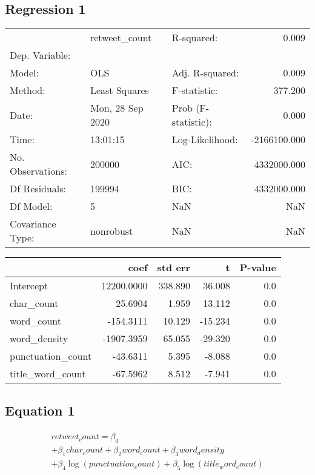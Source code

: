 
\subsection{Regression 1}
\begin{tabular}{lllr}
\toprule
{} &     retweet\_count &           R-squared: &        0.009 \\
Dep. Variable:    &                   &                      &              \\
\midrule
Model:            &               OLS &      Adj. R-squared: &        0.009 \\
Method:           &     Least Squares &         F-statistic: &      377.200 \\
Date:             &  Mon, 28 Sep 2020 &  Prob (F-statistic): &        0.000 \\
Time:             &          13:01:15 &      Log-Likelihood: & -2166100.000 \\
No. Observations: &            200000 &                 AIC: &  4332000.000 \\
Df Residuals:     &            199994 &                 BIC: &  4332000.000 \\
Df Model:         &                 5 &                  NaN &          NaN \\
Covariance Type:  &         nonrobust &                  NaN &          NaN \\
\bottomrule
\end{tabular}

\begin{tabular}{lrrrr}
\toprule
{} &        coef &  std err &       t &  P-value \\
\midrule
Intercept         &  12200.0000 &  338.890 &  36.008 &      0.0 \\
char\_count        &     25.6904 &    1.959 &  13.112 &      0.0 \\
word\_count        &   -154.3111 &   10.129 & -15.234 &      0.0 \\
word\_density      &  -1907.3959 &   65.055 & -29.320 &      0.0 \\
punctuation\_count &    -43.6311 &    5.395 &  -8.088 &      0.0 \\
title\_word\_count  &    -67.5962 &    8.512 &  -7.941 &      0.0 \\
\bottomrule
\end{tabular}



\subsection{Equation 1}
\begin{multline*} \begin{gathered}retweet_count = \beta_{0} \\  + \beta_{1}char_count + \beta_{2}word_count + \beta_{3}word_density \\  + \beta_{4}\log(punctuation_count) + \beta_{5}\log(title_word_count)\end{gathered} \end{multline*}

